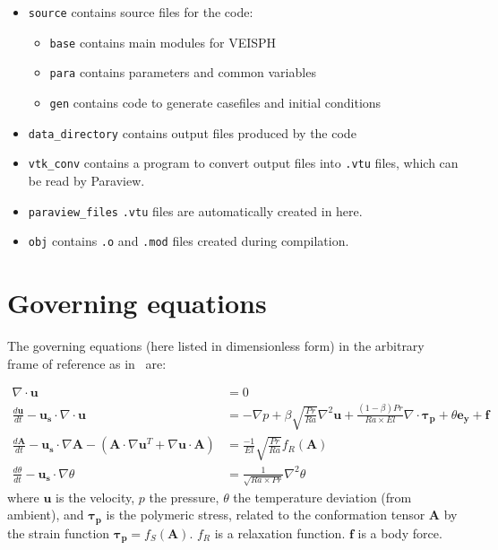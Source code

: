 \documentclass[notitlepage]{revtex4-2}
\begin{document}
\begin{itemize}
\item \verb|source| contains source files for the code:
\begin{itemize}
\item \verb|base| contains main modules for VEISPH
\item \verb|para| contains parameters and common variables
\item \verb|gen| contains code to generate casefiles and initial conditions
\end{itemize}
\item \verb|data_directory| contains output files produced by the code
\item \verb|vtk_conv| contains a program to convert output files into \verb|.vtu| files, which can be read by Paraview.
\item \verb|paraview_files| \verb|.vtu| files are automatically created in here.
\item \verb|obj| contains \verb|.o| and \verb|.mod| files created during compilation.
\end{itemize}  


\section{Governing equations}\label{ge}

The governing equations (here listed in dimensionless form) in the arbitrary frame of reference as in~\cite{king_2020_ve} are:

\begin{subequations}
\begin{align}\nabla\cdot\bm{u}&=0\label{eq:mass}\\
\frac{d\bm{u}}{dt}-\bm{u_{s}}\cdot\nabla\cdot\bm{u}&=-\nabla{p}+\beta\sqrt{\frac{Pr}{Ra}}\nabla^{2}\bm{u}+\frac{\left(1-\beta\right)Pr}{Ra\times{El}}\nabla\cdot\bm{\tau_{p}}+\theta\bm{e_{y}}+\bm{f}\label{eq:mom}\\
\frac{d\bm{A}}{dt}-\bm{u_{s}}\cdot\nabla\bm{A}-\left(\bm{A}\cdot\nabla\bm{u}^{T}+\nabla\bm{u}\cdot\bm{A}\right)&=\frac{-1}{El}\sqrt{\frac{Pr}{Ra}}f_{R}\left(\bm{A}\right)\label{eq:conf}\\
\frac{d\theta}{dt}-\bm{u_{s}}\cdot\nabla\theta&=\frac{1}{\sqrt{Ra\times{Pr}}}\nabla^{2}\theta\label{eq:heat}\end{align}\label{eq:ce}\end{subequations}
where $\bm{u}$ is the velocity, $p$ the pressure, $\theta$ the temperature deviation (from ambient), and $\bm{\tau_{p}}$ is the polymeric stress, related to the conformation tensor $\bm{A}$ by  the strain function $\bm{\tau_{p}}=f_{S}\left(\bm{A}\right)$. $f_{R}$ is a relaxation function. $\bm{f}$ is a body force.
\end{document}

